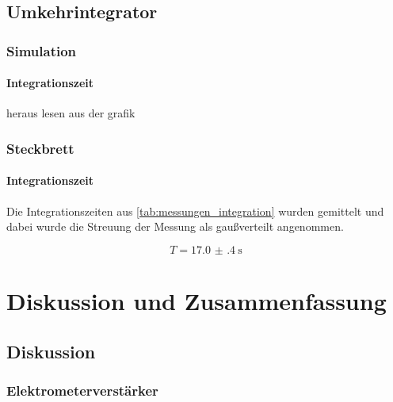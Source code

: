 \documentclass[12pt,english,ngerman]{scrartcl}
\begin{document}
\subsection{Umkehrintegrator}

\subsubsection{Simulation}

\paragraph{Integrationszeit}
heraus lesen aus der grafik

\subsubsection{Steckbrett}
\paragraph{Integrationszeit}
Die Integrationszeiten aus \autoref{tab:messungen_integration} wurden gemittelt
und dabei wurde die Streuung der Messung als gaußverteilt angenommen.

\begin{equation}
  T = \SI{17.0(4)}{\second}
  \label{eq:wert_integrationszeit}
\end{equation}

\section{Diskussion und Zusammenfassung}\label{sec:Diskussion} 
\subsection{Diskussion}

\subsubsection{Elektrometerverstärker}
\end{document}
